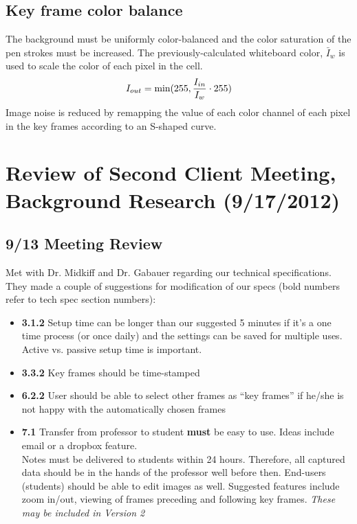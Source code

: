 \documentclass[]{article}
\begin{document}
	\subsection*{Key frame color balance}
The background must be uniformly color-balanced and the color saturation of the pen strokes must be increased.  The previously-calculated whiteboard color, $\bar{I}_w$ is used to scale the color of each pixel in the cell. \[ I_{out} = \textrm{min} (255, {I_{in} \over I_w} \cdot 255) \]
Image noise is reduced by remapping the value of each color channel of each pixel in the key frames according to an S-shaped curve.

	\section{Review of Second Client Meeting, Background Research (9/17/2012)}

		\subsection*{9/13 Meeting Review}
Met with Dr. Midkiff and Dr. Gabauer regarding our technical specifications.  They made a couple of suggestions for modification of our specs (bold numbers refer to tech spec section numbers):
\begin{itemize}
\item \textbf{3.1.2} Setup time can be longer than our suggested 5 minutes if it's a one time process (or once daily) and the settings can be saved for multiple uses. Active vs. passive setup time is important.
\item \textbf{3.3.2} Key frames should be time-stamped
\item \textbf{6.2.2} User should be able to select other frames as ``key frames'' if he/she is not happy with the automatically chosen frames
\item \textbf{7.1} Transfer from professor to student \textbf{must} be easy to use.  Ideas include email or a dropbox feature. \\  
\indent Notes must be delivered to students within 24 hours.  Therefore, all captured data should be in the hands of the professor well before then. \newline
\hspace{0.1in} End-users (students) should be able to edit images as well. Suggested features include zoom in/out, viewing of frames preceding and following key frames.  \sl{These may be included in Version 2}
\end{itemize}
\end{document}
